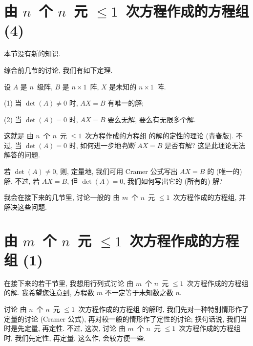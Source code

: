 \section{\texorpdfstring{由 \(n\)~个 \(n\)~元
      \({\leq} 1\)~次方程作成的方程组 (4)}%
  {由 n 个 n 元 ≤1 次方程作成的方程组 (4)}}

\maldevigalegajxo

本节没有新的知识.

综合前几节的讨论, 我们有如下定理.

\begin{theorem}
    设 \(A\) 是 \(n\)~级阵,
    \(B\) 是 \(n \times 1\)~阵,
    \(X\) 是未知的 \(n \times 1\)~阵.

    (1)
    当 \(\det {(A)} \neq 0\) 时,
    \(AX = B\) 有唯一的解;

    (2)
    当 \(\det {(A)} = 0\) 时,
    \(AX = B\) 要么无解,
    要么有无限多个解.
\end{theorem}

这就是%
由 \(n\)~个 \(n\)~元 \({\leq} 1\)~次方程作成的方程组%
的解的定性的理论 (青春版).
不过,
当 \(\det {(A)} = 0\) 时,
如何进一步地\emph{判断} \(AX = B\) 是否有解?
这是此理论无法解答的问题.

若 \(\det {(A)} \neq 0\),
则, 定量地,
我们可用 Cramer 公式写出
\(AX = B\) 的 (唯一的) 解.
不过, 若 \(AX = B\),
但 \(\det {(A)} = 0\),
我们如何写出它的 (所有的) 解?

我会在接下来的几节里,
讨论一般的%
由 \(m\)~个 \(n\)~元 \({\leq} 1\)~次方程作成的方程组,
并解决这些问题.

\section{\texorpdfstring{由 \(m\)~个 \(n\)~元
      \({\leq} 1\)~次方程作成的方程组 (1)}%
  {由 m 个 n 元 ≤1 次方程作成的方程组 (1)}}

\maldevigalegajxo

在接下来的若干节里, 我想用行列式讨论%
由 \(m\)~个 \(n\)~元 \({\leq} 1\)~次方程作成的方程组%
的解.
我希望您注意到, 方程数 \(m\) 不一定等于未知数之数 \(n\).

讨论%
由 \(n\)~个 \(n\)~元 \({\leq} 1\)~次方程作成的方程组%
的解时,
我们先对一种特别情形作了定量的讨论
(Cramer 公式),
再对较一般的情形作了定性的讨论;
换句话说, 我们当时是先定量, 再定性.
不过, 这次,
讨论%
由 \(m\)~个 \(n\)~元 \({\leq} 1\)~次方程作成的方程组%
时, 我们先定性, 再定量.
这么作, 会较方便一些.

